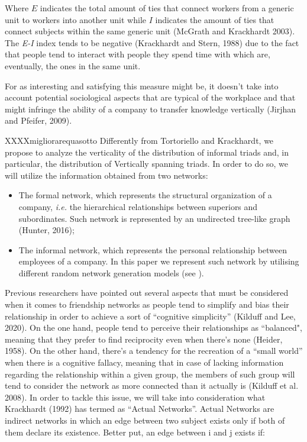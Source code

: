 \documentclass{article}
\begin{document}
Where $E$ indicates the total amount of ties that connect workers from a generic unit to workers into another unit while $I$ indicates the amount of ties that connect subjects within the same generic unit (McGrath and Krackhardt 2003). The \emph{E-I} index tends to be negative (Krackhardt and Stern, 1988) due to the fact that people tend to interact with people they spend time with which are, eventually, the ones in the same unit. 

For as interesting and satisfying this measure might be, it doesn’t take into account potential sociological aspects that are typical of the workplace and that might infringe the ability of a company to transfer knowledge vertically (Jirjhan and Pfeifer, 2009).


XXXXmigliorarequasotto
Differently from Tortoriello and Krackhardt, we propose to analyze the verticality of the distribution of informal triads and, in particular, the distribution of Vertically spanning triads. In order to do so, we will utilize the information obtained from two networks:
\begin{itemize}
	\item The formal network, which represents the structural organization of a company, \emph{i.e.} the hierarchical relationships between superiors and subordinates. Such network is represented by an undirected tree-like graph (Hunter, 2016);
	\item The informal network, which represents the personal relationship between employees of a company. In this paper we represent such network by utilising different random network generation models (see ).
\end{itemize}
Previous researchers have pointed out several aspects that must be considered when it comes to friendship networks as people tend to simplify and bias their relationship in order to achieve a sort of “cognitive simplicity” (Kilduff and Lee, 2020). On the one hand, people tend to perceive their relationships as “balanced", meaning that they prefer to find reciprocity even when there’s none (Heider, 1958). On the other hand, there’s a tendency for the recreation of a “small world” when there is a cognitive fallacy, meaning that in case of lacking information regarding the relationship within a given group, the members of such group will tend to consider the network as more connected than it actually is (Kilduff et al. 2008).
In order to tackle this issue, we will take into consideration what Krackhardt (1992) has termed as “Actual Networks”. Actual Networks are indirect networks in which an edge between two subject exists only if both of them declare its existence. Better put, an edge between i and j exists if:
\end{document}
